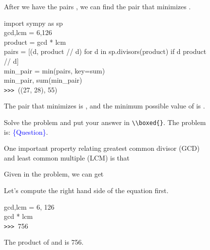 \documentclass{article} \usepackage{iclr2023_conference,times}
\begin{document}
\begin{figure}[t]
\begin{minipage}{0.62\textwidth}
\begin{minipage}{0.57\textwidth}
\begin{tcolorbox}[colback=red!5!white,colframe=red!75!black,title=\large(b)~\normalsize Model output,
    left=1mm,  right=1mm, top=1mm,   bottom=1mm ]
\begin{tiny}
After we have the pairs , we can find the pair that minimizes .
\begin{tcolorbox}[colback=black!5!white,colframe=black!75!black,title=code,
    left=1mm,  right=1mm, top=1mm,   bottom=1mm ]
import sympy as sp\\
gcd,lcm = 6,126\\
product = gcd * lcm\\
pairs = [(d, product // d) for d in sp.divisors(product) if d  product // d]\\
min\_pair = min(pairs, key=sum)\\
min\_pair, sum(min\_pair)\\
\texttt{>>> }((27, 28), 55)
\end{tcolorbox}
The pair  that minimizes  is , and the minimum possible value of  is .\Large\textcolor{red}{\xmark}
\end{tiny}
\vspace{-0.36mm}
\end{tcolorbox}
\end{minipage}
\end{minipage}
\hfill
\begin{minipage}{0.37\textwidth}
\begin{tcolorbox}[colback=green!5!white,colframe=green!75!black,title=\large(c)~\normalsize Model output,
    left=1mm,  right=1mm, top=1mm,   bottom=1mm ]
\begin{tiny}
\begin{tcolorbox}[colback=blue!9!white,colframe=blue!75!black,title=BasicPrompt,
    left=1mm,  right=1mm, top=1mm,   bottom=1mm ]
Solve the problem and put your answer in \verb|\\boxed{}|. The problem is: \textcolor{blue}{\{Question\}}.
\end{tcolorbox}
One important property relating greatest common divisor (GCD) and least common multiple (LCM) is that
\vspace{-1mm}

\vspace{-0.79mm}
Given in the problem, we can get 
\vspace{-1mm}

\vspace{-0.62mm}
Let's compute the right hand side of the equation first.
\begin{tcolorbox}[colback=black!5!white,colframe=black!75!black,title=code,
    left=1mm,  right=1mm, top=1mm,   bottom=1mm ]
gcd,lcm = 6, 126\\
gcd * lcm\\
\texttt{>>> }{756}
\end{tcolorbox}
The product of  and  is 756.


\end{tiny}
\end{tcolorbox}
\end{minipage}
\end{figure}
\end{document}
